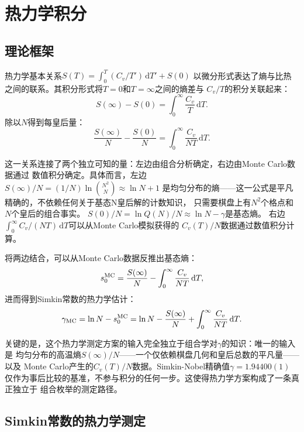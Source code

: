 ﻿\chapter{热力学积分}

\section{理论框架}

热力学基本关系$S(T)=\int_{0}^{T}(C_{v}/T')\,\mathrm{d}T'+S(0)$
以微分形式表达了熵与比热之间的联系。其积分形式将$T=0$和$T=\infty$之间的熵差与
$C_{v}/T$的积分关联起来：
%
\begin{equation}
  S(\infty) - S(0) = \int_{0}^{\infty} \frac{C_{v}}{T}\,\mathrm{d}T.
  \label{eq:thermo_int}
\end{equation}
%
除以$N$得到每皇后量：
%
\begin{equation}
  \frac{S(\infty)}{N} - \frac{S(0)}{N}
  = \int_{0}^{\infty} \frac{C_{v}}{NT}\,\mathrm{d}T.
  \label{eq:DS}
\end{equation}

这一关系连接了两个独立可知的量：左边由组合分析确定，右边由Monte Carlo数据通过
数值积分确定。具体而言，左边$S(\infty)/N=(1/N)\ln\binom{N^{2}}{N}\approx\ln N+1$
是均匀分布的熵——这一公式是平凡精确的，不依赖任何关于基态N皇后解的计数知识，
只需要棋盘上有$N^{2}$个格点和$N$个皇后的组合事实。
$S(0)/N=\ln Q(N)/N\approx\ln N-\gamma$是基态熵。
右边$\int_{0}^{\infty}C_{v}/(NT)\,\mathrm{d}T$可以从Monte Carlo模拟获得的
$C_{v}(T)/N$数据通过数值积分计算。

将两边结合，可以从Monte Carlo数据反推出基态熵：
%
\begin{equation}
  s_{0}^{\rm MC} = \frac{S(\infty)}{N}
    - \int_{0}^{\infty}\frac{C_{v}}{NT}\,\mathrm{d}T,
  \label{eq:s0_MC}
\end{equation}
%
进而得到Simkin常数的热力学估计：
%
\begin{equation}
  \gamma_{\rm MC} = \ln N - s_{0}^{\rm MC}
  = \ln N - \frac{S(\infty)}{N}
    + \int_{0}^{\infty}\frac{C_{v}}{NT}\,\mathrm{d}T.
\end{equation}

关键的是，这个热力学测定方案的输入完全独立于组合学对$\gamma$的知识：唯一的输入是
均匀分布的高温熵$S(\infty)/N$——一个仅依赖棋盘几何和皇后总数的平凡量——以及
Monte Carlo产生的$C_{v}(T)/N$数据。Simkin-Nobel精确值$\gamma=1.94400(1)$
仅作为事后比较的基准，不参与积分的任何一步。这使得热力学方案构成了一条真正独立于
组合枚举的测定路径。

\section{Simkin常数的热力学测定}


